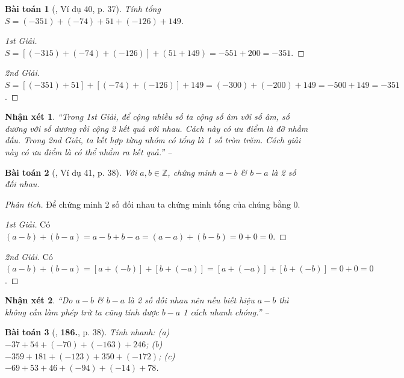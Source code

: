 \documentclass{article}
\numberwithin{equation}{section}
\newtheorem{baitoan}{Bài toán}
\newtheorem{nhanxet}{Nhận xét}[section]
\begin{document}
\begin{baitoan}[\cite{Tuyen_Toan_6}, Ví dụ 40, p. 37]
	Tính tổng $S = (-351) + (-74) + 51 + (-126) + 149$.
\end{baitoan}

\begin{proof}[1st Giải]
	$S = [(-315) + (-74) + (-126)] + (51 + 149) = -551 + 200 = -351$.
\end{proof}

\begin{proof}[2nd Giải]
	$S = [(-351) + 51] + [(-74) + (-126)] + 149 = (-300) + (-200) + 149 = -500 + 149 = -351$.
\end{proof}

\begin{nhanxet}
	``Trong 1st Giải, để cộng nhiều số ta cộng số âm với số âm, số dương với số dương rồi cộng 2 kết quả với nhau. Cách này có ưu điểm là đỡ nhầm dấu. Trong 2nd Giải, ta kết hợp từng nhóm có tổng là 1 số tròn trăm. Cách giải này có ưu điểm là có thể nhẩm ra kết quả.'' -- \cite[p. 37]{Tuyen_Toan_6}
\end{nhanxet}

\begin{baitoan}[\cite{Tuyen_Toan_6}, Ví dụ 41, p. 38]
	Với $a,b\in\mathbb{Z}$, chứng minh $a - b$ \& $b - a$ là 2 số đối nhau.
\end{baitoan}
\noindent\textit{Phân tích.} Để chứng minh 2 số đối nhau ta chứng minh tổng của chúng bằng $0$.
 
\begin{proof}[1st Giải]
	Có $(a - b) + (b - a) = a - b + b - a = (a - a) + (b - b) = 0 + 0 = 0$.
\end{proof}

\begin{proof}[2nd Giải]
	Có $(a - b) + (b - a) = [a + (-b)] + [b + (-a)] = [a + (-a)] + [b + (-b)] = 0 + 0 = 0$.
\end{proof}

\begin{nhanxet}
	``Do $a - b$ \& $b - a$ là 2 số đối nhau nên nếu biết hiệu $a - b$ thì không cần làm phép trừ ta cũng tính được $b - a$ 1 cách nhanh chóng.'' -- \cite[p. 38]{Tuyen_Toan_6}
\end{nhanxet}

\begin{baitoan}[\cite{Tuyen_Toan_6}, \textbf{186.}, p. 38]
	Tính nhanh: (a) $-37 + 54 + (-70) + (-163) + 246$; (b) $-359 + 181 + (-123) + 350 + (-172)$; (c) $-69 + 53 + 46 + (-94) + (-14) + 78$.
\end{baitoan}
\end{document}
